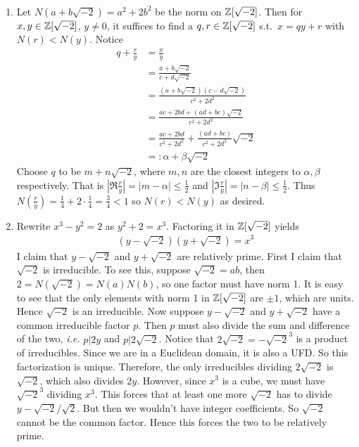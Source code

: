 \documentclass[12pt,class=article,crop=false]{standalone}
\begin{document}
\begin{problem}[5]
	~\begin{enumerate}[label=(\alph*)]
		\item Let $ N(a+b\sqrt{-2} ) = a^2+2b^2$ be the norm on $ \mathbb{Z}[\sqrt{-2} ]$. Then for $ x,y \in \mathbb{Z}[\sqrt{-2} ]$, $ y \neq 0$, it suffices to find a $ q,r \in \mathbb{Z}[\sqrt{-2} ]$ s.t.\  $ x=qy+r$ with $ N(r)<N(y)$. Notice
	\begin{align*}
		q+\frac{r}{y} &= \frac{x}{y}\\
			      &=\frac{a+b\sqrt{-2} }{c+d\sqrt{-2}  }\\ 
			      &= \frac{(a+b\sqrt{-2} )(c-d\sqrt{-2})}{ c^2+2d^2}\\
		&= \frac{ac+2bd+(ad+bc)\sqrt{-2} }{ c^2+2d^2} \\
		&= \frac{ac+2bd}{c^2+2d^2}+ \frac{(ad+bc)}{ c^2+2d^2} \sqrt{-2}  \\
		&=: \alpha + \beta \sqrt{-2}  
	\end{align*}
	Choose $ q$ to be $ m+n\sqrt{-2}$, where $ m,n$ are the closest integers to  $ \alpha, \beta$ respectively. That is $|\Re \frac{r}{y}|= |m- \alpha|\leq \frac{1}{2}$ and $|\Im \frac{r}{y}| = |n- \beta| \leq \frac{1}{2}$. Thus $ N\left( \frac{r}{y} \right) = \frac{1}{4} + 2 \cdot \frac{1}{4} = \frac{3}{4} <1$ so $ N( r) < N(y)$ as desired. 
\item Rewrite $ x^3 - y^2 = 2$ as $ y^2+2 = x^3$. Factoring it in $ \mathbb{Z}[\sqrt{-2} ]$ yields
	\begin{align*}
		(y-\sqrt{-2})(y+\sqrt{-2})  = x^3 
	\end{align*}
	I claim that $ y-\sqrt{-2} $ and $ y+\sqrt{-2} $ are relatively prime. First I claim that $ \sqrt{-2}$ is irreducible. To see this, suppose $ \sqrt{-2}=ab$, then $ 2 = N(\sqrt{-2}) = N(a)N(b)$, so one factor must have norm 1. It is easy to see that the only elements with norm 1 in $ \mathbb{Z}[\sqrt{-2} ]$ are $ \pm 1$, which are units. Hence $ \sqrt{-2} $ is an irreducible. Now suppose $ y-\sqrt{-2} $ and $ y+\sqrt{-2} $ have a common irreducible factor $ p$. Then $ p$ must also divide the sum and difference of the two,  \emph{i.e.}  $ p| 2y$ and $ p|2\sqrt{-2}$. Notice that $ 2\sqrt{-2} = -\sqrt{-2}^3$ is a product of irreducibles. Since we are in a Euclidean domain, it is also a UFD. So this factorization is unique. Therefore, the only irreducibles dividing $ 2\sqrt{-2} $ is $ \sqrt{-2}$, which also divides $ 2y$. However, since  $ x^3$ is a cube, we must have $ \sqrt{-2}^3$ dividing $ x^3$. This forces that at least one more $ \sqrt{-2} $ has to divide $ y-\sqrt{-2} / \sqrt{2} $. But then we wouldn't have integer coefficients. So $ \sqrt{-2} $ cannot be the common factor. Hence this forces the two to be relatively prime.


\end{enumerate}
\end{problem}
\end{document}
